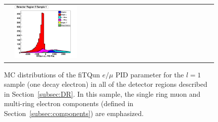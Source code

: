 {\begin{figure}[h!]
\begin{tabular}{l  l  l}
  &\includegraphics[width=0.33\textwidth]{plots/mc_breakdown_comp_1_bin_5_att_0} 
\end{tabular} 
\caption{MC distributions of the fiTQun $e/\mu$ PID parameter for the $l = 1$
sample (one decay electron) in all of the detector regions described in
Section~\ref{subsec:DR}.  In this sample, the single ring muon and multi-ring
electron components (defined in Section~\ref{subsec:components}) are
emphasized.}
\label{fig:samplot1}
\end{figure}

}
